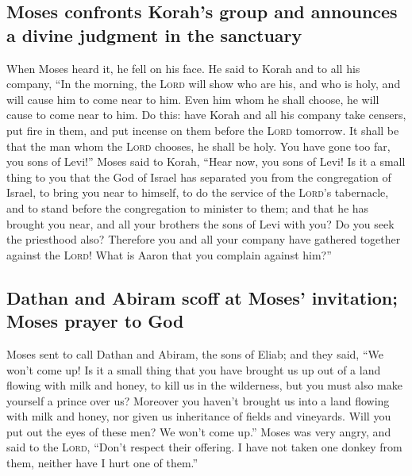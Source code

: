 \hypertarget{moses-confronts-korahs-group-and-announces-a-divine-judgment-in-the-sanctuary}{%
\subsection{Moses confronts Korah's group and announces a divine
judgment in the
sanctuary}\label{moses-confronts-korahs-group-and-announces-a-divine-judgment-in-the-sanctuary}}

 When Moses heard it, he fell on his face. 
He said to Korah and to all his company, ``In the morning, the
\textsc{Lord} will show who are his, and who is holy, and will cause him
to come near to him. Even him whom he shall choose, he will cause to
come near to him.  Do this: have Korah and all his company
take censers,  put fire in them, and put incense on them
before the \textsc{Lord} tomorrow. It shall be that the man whom the
\textsc{Lord} chooses, he shall be holy. You have gone too far, you sons
of Levi!''  Moses said to Korah, ``Hear now, you sons of
Levi!  Is it a small thing to you that the God of Israel
has separated you from the congregation of Israel, to bring you near to
himself, to do the service of the \textsc{Lord}'s tabernacle, and to
stand before the congregation to minister to them;  and
that he has brought you near, and all your brothers the sons of Levi
with you? Do you seek the priesthood also?  Therefore you
and all your company have gathered together against the \textsc{Lord}!
What is Aaron that you complain against him?''

\hypertarget{dathan-and-abiram-scoff-at-moses-invitation-moses-prayer-to-god}{%
\subsection{Dathan and Abiram scoff at Moses' invitation; Moses prayer
to
God}\label{dathan-and-abiram-scoff-at-moses-invitation-moses-prayer-to-god}}

 Moses sent to call Dathan and Abiram, the sons of Eliab;
and they said, ``We won't come up!  Is it a small thing
that you have brought us up out of a land flowing with milk and honey,
to kill us in the wilderness, but you must also make yourself a prince
over us?  Moreover you haven't brought us into a land
flowing with milk and honey, nor given us inheritance of fields and
vineyards. Will you put out the eyes of these men? We won't come up.''
 Moses was very angry, and said to the \textsc{Lord},
``Don't respect their offering. I have not taken one donkey from them,
neither have I hurt one of them.''

